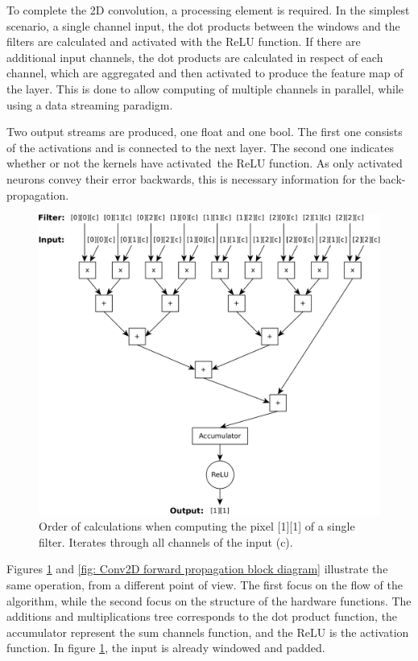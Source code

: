 To complete the 2D convolution, a processing element is required. In the simplest scenario, a single channel input, the dot products between the windows and the filters are calculated and activated with the ReLU function. If there are additional input channels, the dot products are calculated in respect of each channel, which are aggregated and then activated to produce the feature map of the layer. This is done to allow computing of multiple channels in parallel, while using a data streaming paradigm.

Two output streams are produced, one float and one bool. The first one consists of the activations and is connected to the next layer. The second one indicates whether or not the kernels have activated the ReLU function. As only activated neurons convey their error backwards, this is necessary information for the back-propagation.

\begin{figure}[H]
    \centering
        \includegraphics[width=1\textwidth]{Images/block_diagrams/conv_mc_order_calculations.png}
        \decoRule
        \caption[Conv2D order of calculations]{Order of calculations when computing the pixel [1][1] of a single filter. Iterates through all channels of the input (c).}
        \label{fig: Conv2D order of calculations}
\end{figure}

Figures \ref{fig: Conv2D order of calculations} and \ref{fig: Conv2D forward propagation block diagram} illustrate the same operation, from a different point of view. The first focus on the flow of the algorithm, while the second focus on the structure of the hardware functions. The additions and multiplications tree corresponds to the dot product function, the accumulator represent the sum channels function, and the ReLU is the activation function. In figure \ref{fig: Conv2D order of calculations}, the input is already windowed and padded.

